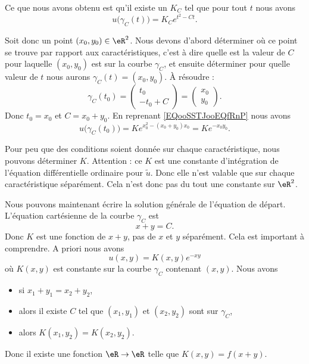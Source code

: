 Ce que nous avons obtenu est qu'il existe un \( K_C\) tel que pour tout \( t\) nous avons
\begin{equation}
    u\big( \gamma_C(t) \big)=K_C e^{t^2-Ct}.
\end{equation}

Soit donc un point \( (x_0,y_0)\in \eR^2\). Nous devons d'abord déterminer où ce point se trouve par rapport aux caractéristiques, c'est à dire quelle est la valeur de \( C\) pour laquelle \( (x_0,y_0)\) est sur la courbe \( \gamma_C\), et ensuite déterminer pour quelle valeur de \( t\) nous aurons \( \gamma_C(t)=(x_0,y_0)\). À résoudre :
\begin{equation}
    \gamma_C(t_0)=\begin{pmatrix}
        t_0    \\
        -t_0+C
    \end{pmatrix}=\begin{pmatrix}
        x_0    \\
        y_0
    \end{pmatrix}.
\end{equation}
Donc \( t_0=x_0\) et \( C=x_0+y_0\). En reprenant \eqref{EQooSSTJooEQfRnP} nous avons
\begin{equation}
    u\big( \gamma_C(t_0) \big)=K e^{x_0^2-(x_0+y_0)x_0}=K e^{-x_0y_0}.
\end{equation}

Pour peu que des conditions soient donnée sur chaque caractéristique, nous pouvons déterminer \( K\). Attention : ce \( K\) est une constante d'intégration de l'équation différentielle ordinaire pour \( \tilde u\). Donc elle n'est valable que sur chaque caractéristique séparément. Cela n'est donc pas du tout une constante sur \( \eR^2\).

Nous pouvons maintenant écrire la solution générale de l'équation de départ. L'équation cartésienne de la courbe \( \gamma_C\) est
\begin{equation}
    x+y=C.
\end{equation}
Donc \( K\) est une fonction de \( x+y\), pas de \( x\) et \( y\) séparément. Cela est important à comprendre. A priori nous avons
\begin{equation}
    u(x,y)=K(x,y) e^{-xy}
\end{equation}
où \( K(x,y)\) est constante sur la courbe \( \gamma_C\) contenant \( (x,y)\). Nous avons
\begin{itemize}
    \item si \( x_1+y_1=x_2+y_2\),
    \item alors il existe \( C\) tel que \( (x_1,y_1)\) et \( (x_2,y_2)\) sont sur \( \gamma_C\),
    \item alors \( K(x_1,y_2)=K(x_2,y_2)\).
\end{itemize}
Donc il existe une fonction \( \eR\to \eR\) telle que \( K(x,y)=f(x+y)\).

